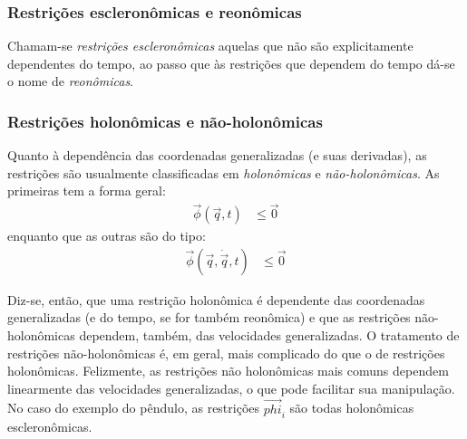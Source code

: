 \subsubsection{Restrições escleronômicas e reonômicas} Chamam-se \textit{restrições escleronômicas} aquelas que não são explicitamente dependentes do tempo, ao passo que às restrições que dependem do tempo dá-se o nome de \textit{reonômicas}.

\subsubsection{Restrições holonômicas e não-holonômicas} Quanto à dependência das coordenadas generalizadas (e suas derivadas), as restrições são usualmente classificadas em \textit{holonômicas} e \textit{não-holonômicas}. As primeiras tem a forma geral:
\begin{align}
 \vec{\phi}(\vec{q},t) &\leq \vec{0} \label{eq:rest holonômicas}
\end{align}
enquanto que as outras são do tipo:
\begin{align}
 \vec{\phi}(\vec{q},\dot{\vec{q}},t) &\leq \vec{0} \label{eq: rest não-holonômicas}
\end{align}

Diz-se, então, que uma restrição holonômica é dependente das coordenadas generalizadas (e do tempo, se for também reonômica) e que as restrições não-holonômicas dependem, também, das velocidades generalizadas. O tratamento de restrições não-holonômicas é, em geral, mais complicado do que o de restrições holonômicas. Felizmente, as restrições não holonômicas mais comuns dependem linearmente das velocidades generalizadas, o que pode facilitar sua manipulação. No caso do exemplo do pêndulo, as restrições $\vec{phi}_i$ são todas holonômicas escleronômicas.

